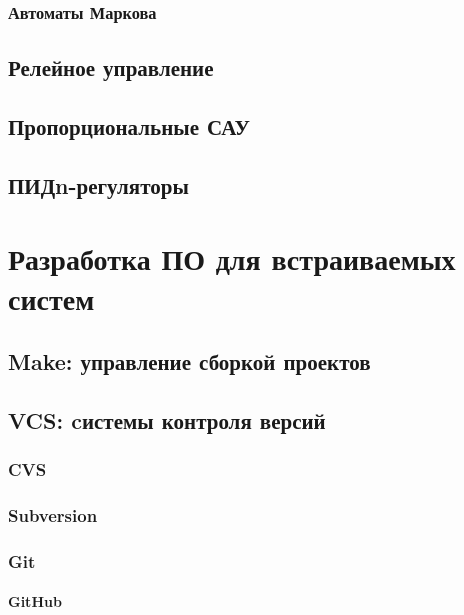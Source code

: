 \section{Автоматы Маркова}

\chapter{Релейное управление}

\chapter{Пропорциональные САУ}

\chapter{ПИДn-регуляторы}

\part{Разработка ПО для встраиваемых систем}



\chapter{Make: управление сборкой проектов}\label{make}

\chapter{VCS: cистемы контроля версий}\label{vcs}

\section{CVS}

\section{Subversion}

\section{Git}

\subsection{GitHub}

